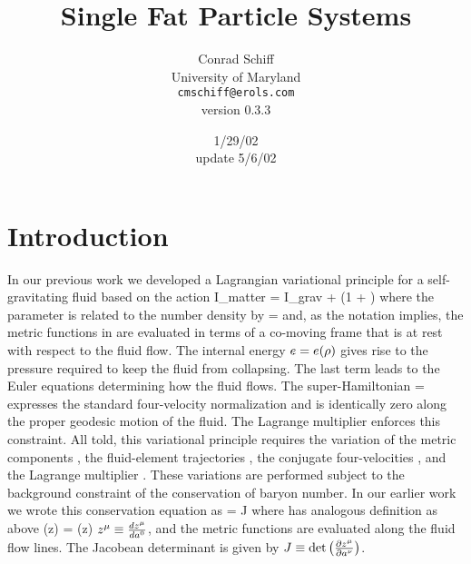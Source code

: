 \documentclass{article}
\begin{document}
\title{Single Fat Particle Systems}
\author{Conrad Schiff \\
        University of Maryland\\
      \texttt{cmschiff@erols.com} \\
      version 0.3.3}
\date{1/29/02  \\ \small{update 5/6/02} }
\maketitle
%
\section{Introduction}

In our previous work we developed a Lagrangian variational
principle for a self-gravitating fluid based on the action
\bes
I_{matter} = I_{grav} +  \gtro (1 + \erg) \surb{
\pdtraj{\gm} \pvel{\gm} - \gL \mH} \eqc
\ees
where the parameter \gtro is related to the number density \gr by
\bes
  \gtro = \gr \contarg {}
\ees
and, as the notation implies, the metric functions in \gtro are
evaluated in terms of a co-moving frame that is at rest with
respect to the fluid flow. The internal energy $e = e(\rho)$ gives
rise to the pressure required to keep the fluid from collapsing.
The last term leads to the Euler equations determining how the
fluid flows.  The super-Hamiltonian
\bes
  \mH = 
\ees
expresses the standard four-velocity normalization and is identically zero along
the proper geodesic motion \ptraj{\gm} of the fluid.
The Lagrange multiplier \gL enforces this constraint.
All told, this variational principle requires the variation of the metric
components \imet{\gm}{\gn}, the fluid-element trajectories
\ptraj{\gn}, the conjugate four-velocities \pvel{\gm}, and the
Lagrange multiplier \gL \back. These variations are performed subject to
the background constraint of the conservation of baryon number. In
our earlier work we wrote this conservation equation as
\bes
  \gtro = \gtr J
\ees
where \gtr has analogous definition as \gtro  above
\bes
\gtr(z) = \gr(z)  \eqc
\ees
$ {z}{{}^{\mu} }  \equiv \frac{d z^{\mu}}{d a^0}$, and the metric
functions are evaluated along the fluid flow lines. The Jacobean determinant
is given by $J \equiv \det \left( {
\frac{\partial z^{\mu}}{\partial a^{\nu}}} \right)$.
\end{document}
